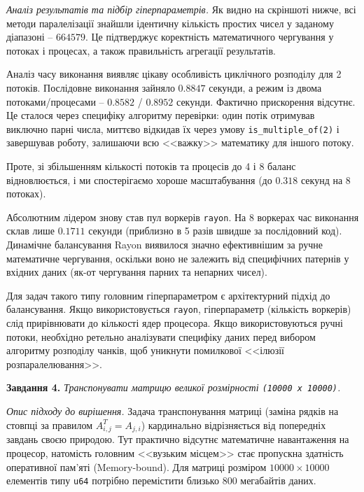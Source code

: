 \documentclass[14pt, a4paper]{extreport}
\begin{document}
	\textit{Аналіз результатів та підбір гіперпараметрів.}
	Як видно на скріншоті нижче, всі методи паралелізації знайшли ідентичну кількість простих чисел у заданому діапазоні -- $664579$. Це підтверджує коректність математичного чергування у потоках і процесах, а також правильність агрегації результатів.
	
	
	Аналіз часу виконання виявляє цікаву особливість циклічного розподілу для 2 потоків. Послідовне виконання зайняло $0.8847$ секунди, а режим із двома потоками/процесами -- $0.8582$ / $0.8952$ секунди. Фактично прискорення відсутнє. Це сталося через специфіку алгоритму перевірки: один потік отримував виключно парні числа, миттєво відкидав їх через умову \texttt{is\_multiple\_of(2)} і завершував роботу, залишаючи всю <<важку>> математику для іншого потоку. 
	
	
	Проте, зі збільшенням кількості потоків та процесів до 4 і 8 баланс відновлюється, і ми спостерігаємо хороше масштабування (до $0.318$ секунд на 8 потоках). 
	
	Абсолютним лідером знову став пул воркерів \texttt{rayon}. На 8 воркерах час виконання склав лише $0.1711$ секунди (приблизно в 5 разів швидше за послідовний код). Динамічне балансування Rayon виявилося значно ефективнішим за ручне математичне чергування, оскільки воно не залежить від специфічних патернів у вхідних даних (як-от чергування парних та непарних чисел).
	
	Для задач такого типу головним гіперпараметром є архітектурний підхід до балансування. Якщо використовується \texttt{rayon}, гіперпараметр (кількість воркерів) слід прирівнювати до кількості ядер процесора. Якщо використовуються ручні потоки, необхідно ретельно аналізувати специфіку даних перед вибором алгоритму розподілу чанків, щоб уникнути помилкової <<ілюзії розпаралелювання>>.
	
	\textbf{Завдання 4.} \textit{Транспонувати матрицю великої розмірності \texttt{(10000 х 10000)}.}
	
	\textit{Опис підходу до вирішення.}
	Задача транспонування матриці (заміна рядків на стовпці за правилом $A^T_{i, j} = A_{j, i}$) кардинально відрізняється від попередніх завдань своєю природою. Тут практично відсутнє математичне навантаження на процесор, натомість головним <<вузьким місцем>> стає пропускна здатність оперативної пам'яті (Memory-bound). Для матриці розміром $10000 \times 10000$ елементів типу \texttt{u64} потрібно перемістити близько 800 мегабайтів даних. 
	
\end{document}
